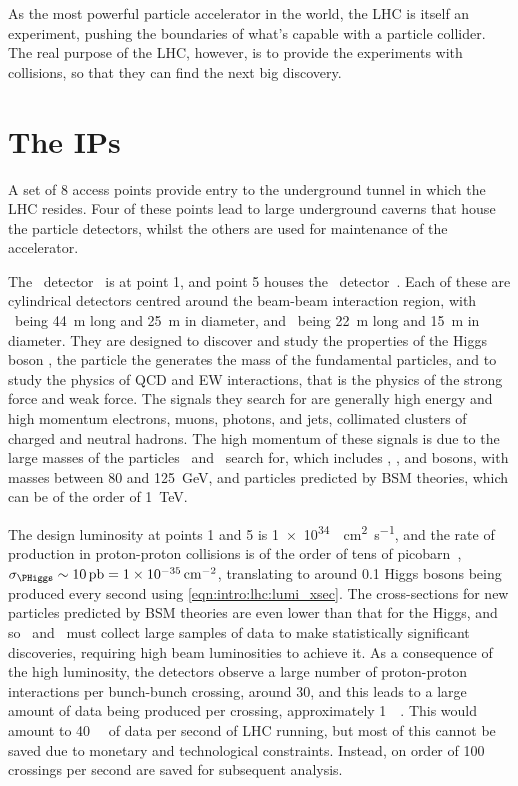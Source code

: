As the most powerful particle accelerator in the world, the \ac{LHC} is itself 
an experiment, pushing the boundaries of what's capable with a particle 
collider.
The real purpose of the \ac{LHC}, however, is to provide the experiments with 
collisions, so that they can find the next big discovery.

\section{The \aclp{IP}}
\label{chap:intro:lhc:ips}

A set of 8 access points provide entry to the underground tunnel in which the 
\ac{LHC} resides.
Four of these points lead to large underground caverns that house the particle 
detectors, whilst the others are used for maintenance of the accelerator.

The \atlas\ detector~\cite{Aad:2008zzm} is at point 1, and point 5 houses the 
\cms\ detector~\cite{Chatrchyan:2008aa}.
Each of these are cylindrical detectors centred around the beam-beam 
interaction region, with \atlas\ being \SI{44}{\metre} long and \SI{25}{\metre} 
in diameter, and \cms\ being \SI{22}{\metre} long and \SI{15}{\metre} in 
diameter.
They are designed to discover and study the properties of the Higgs boson 
\PHiggs, the particle the generates the mass of the fundamental particles, and 
to study the physics of \ac{QCD} and \ac{EW} interactions, that is the physics 
of the strong force and weak force.
The signals they search for are generally high energy and high momentum 
electrons, muons, photons, and jets, collimated clusters of charged and neutral 
hadrons.
The high momentum of these signals is due to the large masses of the particles 
\atlas\ and \cms\ search for, which includes \PW, \PZ, and \PHiggs bosons, with 
masses between 80 and \SI{125}{\GeV}, and particles predicted by \ac{BSM} 
theories, which can be of the order of \SI{1}{\TeV}.

The design luminosity at points 1 and 5 is 
\SI{1e34}{\per\square\centi\metre\per\second}, and the rate of \PHiggs 
production in proton-proton collisions is of the order of tens of 
picobarn~\cite{Khachatryan:2016vau}, $\xsec_{\PHiggs} \sim \SI{10}{\pico\barn} 
= \SI{1e-35}{\per\square\centi\metre}$, translating to around 0.1 Higgs bosons 
being produced every second using \cref{eqn:intro:lhc:lumi_xsec}.
The cross-sections for new particles predicted by \ac{BSM} theories are even 
lower than that for the Higgs, and so \atlas\ and \cms\ must collect large 
samples of data to make statistically significant discoveries, requiring high 
beam luminosities to achieve it.
As a consequence of the high luminosity, the detectors observe a large number 
of proton-proton interactions per bunch-bunch crossing, around 30, and this 
leads to a large amount of data being produced per crossing, approximately 
\SI{1}{\mega\byte}.
This would amount to \SI{40}{\tera\byte} of data per second of \ac{LHC} 
running, but most of this cannot be saved due to monetary and technological 
constraints.
Instead, on order of 100 crossings per second are saved for subsequent 
analysis.

